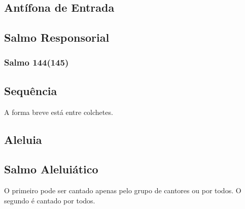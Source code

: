 \subsection{Antífona de Entrada}\label{subsection:tempus-per-annum/sanctissimi-corporis-et-sanguinis-christi/introitus}

\AllowPageFlush

\subsection[Salmo Responsorial]{Salmo Responsorial}\label{subsection:tempus-per-annum/sanctissimi-corporis-et-sanguinis-christi/psalmus-responsorius}
\subsubsection{Salmo 144(145)}

\AllowPageFlush

\subsection{Sequência}\label{subsection:tempus-per-annum/sanctissimi-corporis-et-sanguinis-christi/sequentia}
\begin{rubrica}
  A forma breve está entre colchetes.
\end{rubrica}

\subsection{Aleluia}\label{subsection:tempus-per-annum/sanctissimi-corporis-et-sanguinis-christi/alleluia}

\AllowPageFlush

\subsection[Salmo Aleluiático]{Salmo Aleluiático}\label{subsection:tempus-per-annum/sanctissimi-corporis-et-sanguinis-christi/psalmus-alleluiaticus}
\begin{rubrica}
  O primeiro {\normalfont\Rbar} pode ser cantado apenas pelo grupo de cantores ou por todos. O segundo {\normalfont\Rbar} é cantado por todos.
\end{rubrica}

